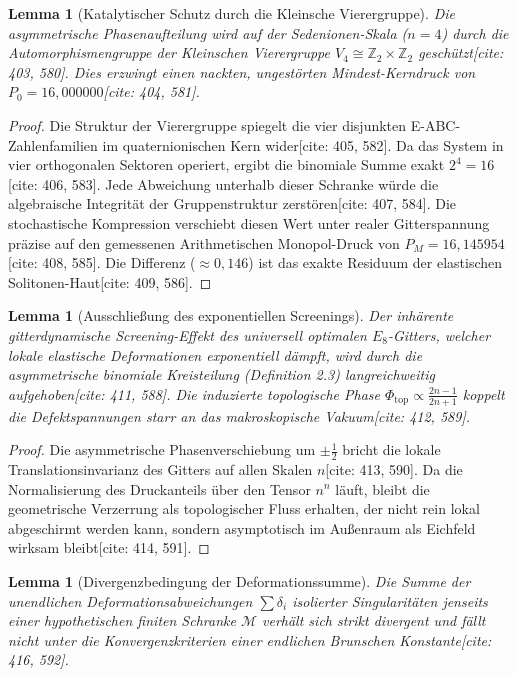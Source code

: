 \documentclass[11pt,a4paper]{article}
\newcommand{\Eoct}{E_8}
\newtheorem{lemma}[theorem]{Lemma}
\theoremstyle{definition}
\begin{document}
	\begin{lemma}[Katalytischer Schutz durch die Kleinsche Vierergruppe]
		Die asymmetrische Phasenaufteilung wird auf der Sedenionen-Skala ($n=4$) durch die Automorphismengruppe der Kleinschen Vierergruppe $V_4 \cong \mathbb{Z}_2 \times \mathbb{Z}_2$ geschützt[cite: 403, 580]. Dies erzwingt einen nackten, ungestörten Mindest-Kerndruck von $P_0 = 16{,}000000$[cite: 404, 581].
	\end{lemma}
	
	\begin{proof}
		Die Struktur der Vierergruppe spiegelt die vier disjunkten E-ABC-Zahlenfamilien im quaternionischen Kern wider[cite: 405, 582]. Da das System in vier orthogonalen Sektoren operiert, ergibt die binomiale Summe exakt $2^4 = 16$[cite: 406, 583]. Jede Abweichung unterhalb dieser Schranke würde die algebraische Integrität der Gruppenstruktur zerstören[cite: 407, 584]. Die stochastische Kompression verschiebt diesen Wert unter realer Gitterspannung präzise auf den gemessenen Arithmetischen Monopol-Druck von $P_M = 16{,}145954$[cite: 408, 585]. Die Differenz ($\approx 0{,}146$) ist das exakte Residuum der elastischen Solitonen-Haut[cite: 409, 586].
	\end{proof}
	
	\begin{lemma}[Ausschließung des exponentiellen Screenings]
		Der inhärente gitterdynamische Screening-Effekt des universell optimalen $\Eoct$-Gitters, welcher lokale elastische Deformationen exponentiell dämpft, wird durch die asymmetrische binomiale Kreisteilung (Definition 2.3) langreichweitig aufgehoben[cite: 411, 588]. Die induzierte topologische Phase $\Phi_{\text{top}} \propto \frac{2n-1}{2n+1}$ koppelt die Defektspannungen starr an das makroskopische Vakuum[cite: 412, 589].
	\end{lemma}
	
	\begin{proof}
		Die asymmetrische Phasenverschiebung um $\pm \frac{1}{2}$ bricht die lokale Translationsinvarianz des Gitters auf allen Skalen $n$[cite: 413, 590]. Da die Normalisierung des Druckanteils über den Tensor $n^n$ läuft, bleibt die geometrische Verzerrung als topologischer Fluss erhalten, der nicht rein lokal abgeschirmt werden kann, sondern asymptotisch im Außenraum als Eichfeld wirksam bleibt[cite: 414, 591].
	\end{proof}
	
	\begin{lemma}[Divergenzbedingung der Deformationssumme]
		Die Summe der unendlichen Deformationsabweichungen $\sum \delta_i$ isolierter Singularitäten jenseits einer hypothetischen finiten Schranke $\mathcal{M}$ verhält sich strikt divergent und fällt nicht unter die Konvergenzkriterien einer endlichen Brunschen Konstante[cite: 416, 592].
	\end{lemma}
	
\end{document}

